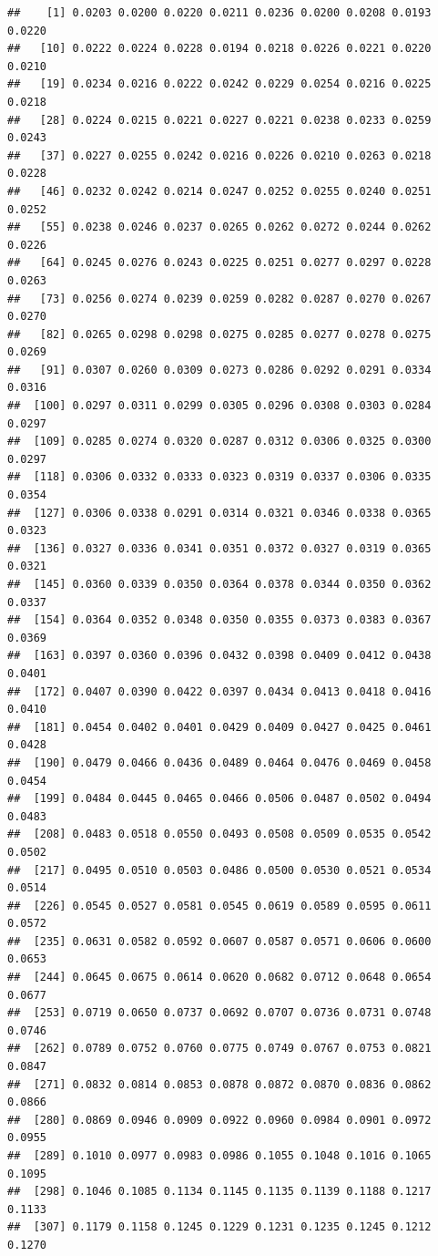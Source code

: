 \documentclass[]{article}
\begin{document}
\begin{verbatim}
##    [1] 0.0203 0.0200 0.0220 0.0211 0.0236 0.0200 0.0208 0.0193 0.0220
##   [10] 0.0222 0.0224 0.0228 0.0194 0.0218 0.0226 0.0221 0.0220 0.0210
##   [19] 0.0234 0.0216 0.0222 0.0242 0.0229 0.0254 0.0216 0.0225 0.0218
##   [28] 0.0224 0.0215 0.0221 0.0227 0.0221 0.0238 0.0233 0.0259 0.0243
##   [37] 0.0227 0.0255 0.0242 0.0216 0.0226 0.0210 0.0263 0.0218 0.0228
##   [46] 0.0232 0.0242 0.0214 0.0247 0.0252 0.0255 0.0240 0.0251 0.0252
##   [55] 0.0238 0.0246 0.0237 0.0265 0.0262 0.0272 0.0244 0.0262 0.0226
##   [64] 0.0245 0.0276 0.0243 0.0225 0.0251 0.0277 0.0297 0.0228 0.0263
##   [73] 0.0256 0.0274 0.0239 0.0259 0.0282 0.0287 0.0270 0.0267 0.0270
##   [82] 0.0265 0.0298 0.0298 0.0275 0.0285 0.0277 0.0278 0.0275 0.0269
##   [91] 0.0307 0.0260 0.0309 0.0273 0.0286 0.0292 0.0291 0.0334 0.0316
##  [100] 0.0297 0.0311 0.0299 0.0305 0.0296 0.0308 0.0303 0.0284 0.0297
##  [109] 0.0285 0.0274 0.0320 0.0287 0.0312 0.0306 0.0325 0.0300 0.0297
##  [118] 0.0306 0.0332 0.0333 0.0323 0.0319 0.0337 0.0306 0.0335 0.0354
##  [127] 0.0306 0.0338 0.0291 0.0314 0.0321 0.0346 0.0338 0.0365 0.0323
##  [136] 0.0327 0.0336 0.0341 0.0351 0.0372 0.0327 0.0319 0.0365 0.0321
##  [145] 0.0360 0.0339 0.0350 0.0364 0.0378 0.0344 0.0350 0.0362 0.0337
##  [154] 0.0364 0.0352 0.0348 0.0350 0.0355 0.0373 0.0383 0.0367 0.0369
##  [163] 0.0397 0.0360 0.0396 0.0432 0.0398 0.0409 0.0412 0.0438 0.0401
##  [172] 0.0407 0.0390 0.0422 0.0397 0.0434 0.0413 0.0418 0.0416 0.0410
##  [181] 0.0454 0.0402 0.0401 0.0429 0.0409 0.0427 0.0425 0.0461 0.0428
##  [190] 0.0479 0.0466 0.0436 0.0489 0.0464 0.0476 0.0469 0.0458 0.0454
##  [199] 0.0484 0.0445 0.0465 0.0466 0.0506 0.0487 0.0502 0.0494 0.0483
##  [208] 0.0483 0.0518 0.0550 0.0493 0.0508 0.0509 0.0535 0.0542 0.0502
##  [217] 0.0495 0.0510 0.0503 0.0486 0.0500 0.0530 0.0521 0.0534 0.0514
##  [226] 0.0545 0.0527 0.0581 0.0545 0.0619 0.0589 0.0595 0.0611 0.0572
##  [235] 0.0631 0.0582 0.0592 0.0607 0.0587 0.0571 0.0606 0.0600 0.0653
##  [244] 0.0645 0.0675 0.0614 0.0620 0.0682 0.0712 0.0648 0.0654 0.0677
##  [253] 0.0719 0.0650 0.0737 0.0692 0.0707 0.0736 0.0731 0.0748 0.0746
##  [262] 0.0789 0.0752 0.0760 0.0775 0.0749 0.0767 0.0753 0.0821 0.0847
##  [271] 0.0832 0.0814 0.0853 0.0878 0.0872 0.0870 0.0836 0.0862 0.0866
##  [280] 0.0869 0.0946 0.0909 0.0922 0.0960 0.0984 0.0901 0.0972 0.0955
##  [289] 0.1010 0.0977 0.0983 0.0986 0.1055 0.1048 0.1016 0.1065 0.1095
##  [298] 0.1046 0.1085 0.1134 0.1145 0.1135 0.1139 0.1188 0.1217 0.1133
##  [307] 0.1179 0.1158 0.1245 0.1229 0.1231 0.1235 0.1245 0.1212 0.1270

\end{verbatim}
\end{document}
